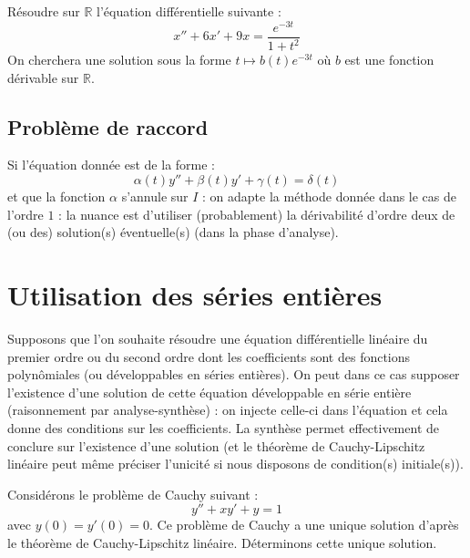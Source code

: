 \documentclass[a4paper,10pt]{report}
\begin{document}
\medskip

\begin{Exemple} Résoudre sur $\mathbb{R}$ l'équation différentielle suivante :
$$ x''+6x'+9x= \dfrac{e^{-3t}}{1+t^2}$$
On cherchera une solution sous la forme $t \mapsto b(t)e^{-3t}$ où $b$ est une fonction dérivable sur $\mathbb{R}$.

\vspace{11cm}
\end{Exemple}


\subsection{Problème de raccord}
Si l'équation donnée est de la forme :
$$ \alpha(t) y''+ \beta(t) y'+ \gamma(t) = \delta(t)$$
et que la fonction $\alpha$ s'annule sur $I$ : on adapte la méthode donnée dans le cas de l'ordre $1$ : la nuance est d'utiliser (probablement) la dérivabilité d'ordre deux de (ou des) solution(s) éventuelle(s) (dans la phase d'analyse).
\section{Utilisation des séries entières}
Supposons que l'on souhaite résoudre une équation différentielle linéaire du premier ordre ou du second ordre dont les coefficients sont des fonctions polynômiales (ou développables en séries entières). On peut dans ce cas supposer l'existence d'une solution de cette équation développable en série entière (raisonnement par analyse-synthèse) : on injecte celle-ci dans l'équation et cela donne des conditions sur les coefficients. La synthèse permet effectivement de conclure sur l'existence d'une solution (et le théorème de Cauchy-Lipschitz linéaire peut même préciser l'unicité si nous disposons de condition(s) initiale(s)).

\medskip

\begin{Exemple} Considérons le problème de Cauchy suivant :
$$ y''+xy'+y=1 $$
avec $y(0)=y'(0)=0$. Ce problème de Cauchy a une unique solution d'après le théorème de Cauchy-Lipschitz linéaire. Déterminons cette unique solution.

\vspace{10cm}
\end{Exemple}
\end{document}
